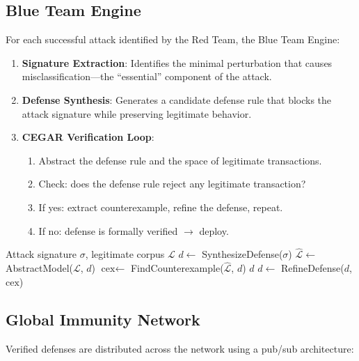 \documentclass[conference]{IEEEtran}
\begin{document}
\subsection{Blue Team Engine}

For each successful attack identified by the Red Team, the Blue Team Engine:

\begin{enumerate}
    \item \textbf{Signature Extraction}: Identifies the minimal perturbation that causes misclassification---the ``essential'' component of the attack.
    \item \textbf{Defense Synthesis}: Generates a candidate defense rule that blocks the attack signature while preserving legitimate behavior.
    \item \textbf{CEGAR Verification Loop}:
    \begin{enumerate}
        \item Abstract the defense rule and the space of legitimate transactions.
        \item Check: does the defense rule reject any legitimate transaction?
        \item If yes: extract counterexample, refine the defense, repeat.
        \item If no: defense is formally verified $\rightarrow$ deploy.
    \end{enumerate}
\end{enumerate}

\begin{algorithm}
\caption{CEGAR Defense Verification}
\begin{algorithmic}[1]
\REQUIRE Attack signature $\sigma$, legitimate corpus $\mathcal{L}$
\STATE $d \leftarrow$ SynthesizeDefense($\sigma$)
\LOOP
    \STATE $\hat{\mathcal{L}} \leftarrow$ AbstractModel($\mathcal{L}$, $d$)
    \STATE $\text{cex} \leftarrow$ FindCounterexample($\hat{\mathcal{L}}$, $d$)
        \RETURN $d$ 
    \ELSE
        \STATE $d \leftarrow$ RefineDefense($d$, $\text{cex}$)
    \ENDIF
\ENDLOOP
\end{algorithmic}
\end{algorithm}

\subsection{Global Immunity Network}

Verified defenses are distributed across the network using a pub/sub architecture:
\end{document}
